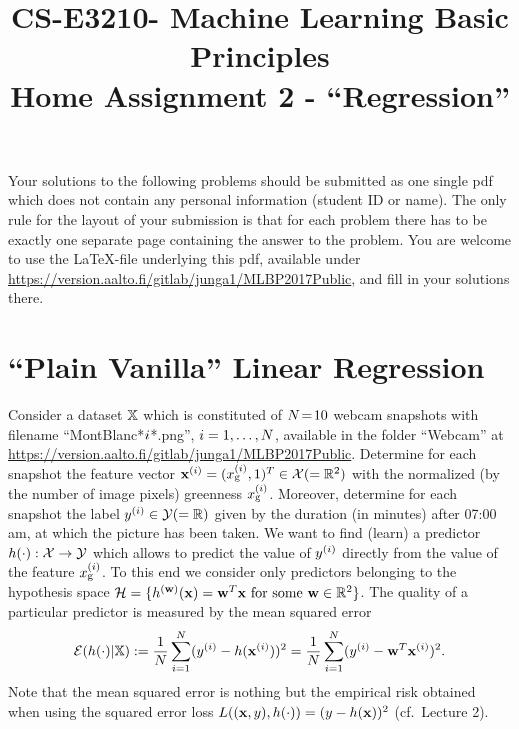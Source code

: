 \documentclass[article,11pt]{article}
\title{CS-E3210- Machine Learning Basic Principles \\ Home Assignment 2 - ``Regression''}
\begin{document}
\date{}
\maketitle

Your solutions to the following problems should be submitted as one single pdf which does not contain 
any personal information (student ID or name). The only rule for the layout of your submission is that for each 
problem there has to be exactly one separate page containing the answer to the problem. You are welcome to use the \LaTeX-file underlying this pdf, 
available under \url{https://version.aalto.fi/gitlab/junga1/MLBP2017Public}, and fill in your solutions there. 

\newpage
\section{``Plain Vanilla'' Linear Regression}
\label{problem_1}

Consider a dataset $\mathbb{X}$ which is constituted of $N\!=\!10$ webcam snapshots with filename 
``MontBlanc*$i$*.png'', $i=1,\ldots,N$, available in the folder ``Webcam'' at \url{https://version.aalto.fi/gitlab/junga1/MLBP2017Public}. 
Determine for each snapshot the feature vector ${\bf x}^{(i)}=(x_{\rm g}^{(i)},1)^{T} \in \mathcal{X} (= \mathbb{R}^{2})$ with the normalized (by the number of image pixels) greenness $x_{\rm g}^{(i)}$. 
Moreover, determine for each snapshot the label $y^{(i)} \in \mathcal{Y} (=\mathbb{R})$ given by the duration (in minutes) after 07:00 am, at which the picture has been taken. 
We want to find (learn) a predictor $h(\cdot): \mathcal{X} \rightarrow \mathcal{Y}$ which allows to predict the value of $y^{(i)}$ directly from 
the value of the feature $x_{\rm g}^{(i)}$. To this end we consider only predictors belonging to the hypothesis space 
$\mathcal{H} = \{h^{({\bf w})}({\bf x}) = {\bf w}^{T} {\bf x} \mbox{ for some } {\bf w} \in \mathbb{R}^{2}\}$. 
The quality of a particular predictor is measured by the mean squared error 
\vspace*{-3mm}
\begin{equation} \label{eq:1}
 \emperror(h(\cdot) | \dataset) \defeq  \frac{1}{\samplesize}\sum^{\samplesize}_{\sampleidx=1}(y^{(\sampleidx)} - h(\vx^{(\sampleidx)}))^2= \frac{1}{\samplesize}\sum^{\samplesize}_{\sampleidx=1}(y^{(\sampleidx)} - \vw^{T} \vx^{(\sampleidx)})^2.
\vspace*{-2mm}
\end{equation} 
Note that the mean squared error is nothing but the empirical risk obtained when using the squared error loss $L({({\bf x},y)},{h(\cdot)}) = (y - h({\bf x}))^{2}$ (cf.\ Lecture 2). 
\end{document}
